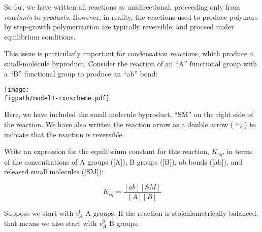 \begin{activity}
\begin{instructornotes}
\end{instructornotes}


\begin{model}

	So far, we have written all reactions as unidirectional, proceeding only from \emph{reactants} to \emph{products}.
	However, in reality, the reactions used to produce polymers by step-growth polymerization are typically reversible, and proceed under equilibrium conditions.
	
	This issue is particularly important for condensation reactions, which produce a small-molecule byproduct.
	Consider the reaction of an ``A'' functional group with a ``B'' functional group to produce an ``ab'' bond:
	
		\vspace{0.1in}
		\centerline{\texttt{[image: \\figpath/model1-rxnscheme.pdf]}}
	
	Here, we have included the small molecule byproduct, ``SM'' on the right side of the reaction.
	We have also written the reaction arrow as a double arrow ($\leftrightharpoons$) to indicate that the reaction is reversible.

\end{model}


\begin{ctqs}

	\question \label{\labelbase:ctq:Keq} Write an expression for the equilibrium constant for this reaction, $K_{eq}$, in terms of the concentrations of A groups ([A]), B groups ([B]), ab bonds ([ab]), and released small molecules ([SM]):
	
		\begin{solution}[1in]
			\begin{equation*}
				K_{eq} = \frac{[ab][SM]}{[A][B]}
			\end{equation*}
		\end{solution}
	
	\question \label{\labelbase:ctq:ICE} Suppose we start with $v_A^0$ A groups.  If the reaction is stoichiometrically balanced, that means we also start with $v_A^0$ B groups.
	

\end{ctqs}
\end{activity}
